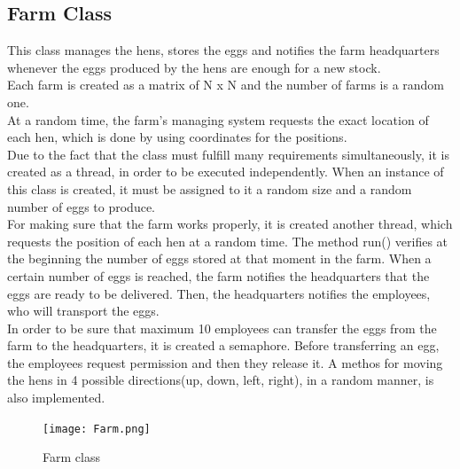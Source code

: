\documentclass{article}
\begin{document}
\subsection{Farm Class}
This class  manages the hens, stores the eggs and notifies the farm headquarters whenever the eggs produced by the hens are enough for a new stock. \\
Each farm is created as a matrix of N x N and the number of farms is a random one. \\
At a random time, the farm's managing system requests the exact location of each hen, which is done by using coordinates for the positions. \\
Due to the fact that the class must fulfill many requirements simultaneously, it is created as a thread, in order to be executed independently. When an  instance of this class is created, it must be assigned to it a random size and a random number of eggs to produce. \\
For making sure that the farm works properly, it is created another thread, which requests the position of each hen at a random time. The method run() verifies at the beginning the number of eggs stored at that moment in the farm. When a certain number of eggs is reached, the farm notifies the headquarters that the eggs are ready to be delivered. Then, the headquarters notifies the employees, who will transport the eggs. \\
In order to be sure that maximum 10 employees can transfer the eggs from the farm to the headquarters, it is created a semaphore. Before transferring an egg, the employees request permission and then they release it. A methos for moving the hens in 4 possible directions(up, down, left, right), in a random manner, is also implemented. 
 \\
 \begin{figure}[htp]
    \centering
    \texttt{[image: Farm.png]}
    \caption{Farm class}
\end{figure}
\end{document}
